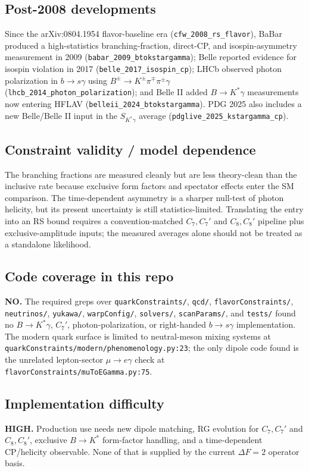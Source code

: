 \subsection*{Post-2008 developments}
Since the arXiv:0804.1954 flavor-baseline era
(\texttt{cfw\_2008\_rs\_flavor}), BaBar produced a high-statistics
branching-fraction, direct-CP, and isospin-asymmetry measurement in 2009
(\texttt{babar\_2009\_btokstargamma}); Belle reported evidence for isospin
violation in 2017 (\texttt{belle\_2017\_isospin\_cp}); LHCb observed photon
polarization in \(b\to s\gamma\) using
\(B^\pm\to K^\pm\pi^\mp\pi^\pm\gamma\)
(\texttt{lhcb\_2014\_photon\_polarization}); and Belle II added
\(B\to K^*\gamma\) measurements now entering HFLAV
(\texttt{belleii\_2024\_btokstargamma}).  PDG 2025 also includes a new
Belle/Belle II input in the \(S_{K^*\gamma}\) average
(\texttt{pdglive\_2025\_kstargamma\_cp}).

\subsection*{Constraint validity / model dependence}
The branching fractions are measured cleanly but are less theory-clean than the
inclusive rate because exclusive form factors and spectator effects enter the
SM comparison.  The time-dependent asymmetry is a sharper null-test of photon
helicity, but its present uncertainty is still statistics-limited.  Translating
the entry into an RS bound requires a convention-matched \(C_7,C_7'\) and
\(C_8,C_8'\) pipeline plus exclusive-amplitude inputs; the measured averages
alone should not be treated as a standalone likelihood.

\subsection*{Code coverage in this repo}
\textbf{NO.}  The required greps over \texttt{quarkConstraints/}, \texttt{qcd/},
\texttt{flavorConstraints/}, \texttt{neutrinos/}, \texttt{yukawa/},
\texttt{warpConfig/}, \texttt{solvers/}, \texttt{scanParams/}, and
\texttt{tests/} found no \(B\to K^*\gamma\), \(C_7'\), photon-polarization, or
right-handed \(b\to s\gamma\) implementation.  The modern quark surface is
limited to neutral-meson mixing systems at
\texttt{quarkConstraints/modern/phenomenology.py:23}; the only dipole code
found is the unrelated lepton-sector \(\mu\to e\gamma\) check at
\texttt{flavorConstraints/muToEGamma.py:75}.

\subsection*{Implementation difficulty}
\textbf{HIGH.}  Production use needs new dipole matching, RG evolution for
\(C_7,C_7'\) and \(C_8,C_8'\), exclusive \(B\to K^*\) form-factor handling,
and a time-dependent CP/helicity observable.  None of that is supplied by the
current \(\Delta F=2\) operator basis.

